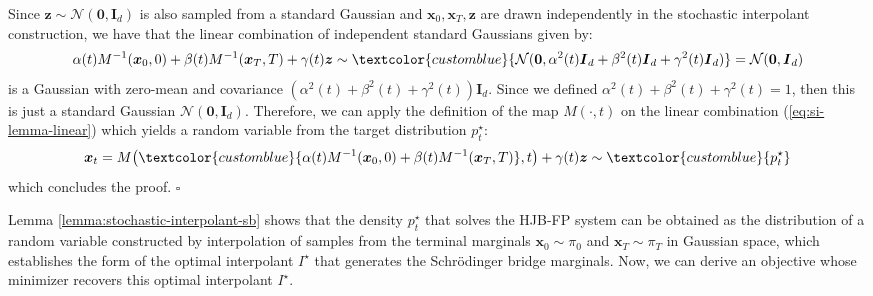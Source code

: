 \documentclass{article}
\newcommand{\bluetext}[1]{\textcolor{customblue}{#1}}
\begin{document}
Since $\boldsymbol{z}\sim \mathcal{N}(\boldsymbol{0}, \boldsymbol{I}_d)$ is also sampled from a standard Gaussian and $\boldsymbol{x}_0, \boldsymbol{x}_T, \boldsymbol{z}$ are drawn independently in the stochastic interpolant construction, we have that the linear combination of independent standard Gaussians given by:
\begin{align}
    \alpha(t)M^{-1}(\boldsymbol{x}_0, 0)+\beta(t)M^{-1}(\boldsymbol{x}_T,T)+\gamma(t)\boldsymbol{z}\sim \bluetext{\mathcal{N}(\boldsymbol{0}, \alpha^2(t)\boldsymbol{I}_d+\beta^2(t)\boldsymbol{I}_d+\gamma^2(t)\boldsymbol{I}_d)}=\mathcal{N}(\boldsymbol{0},\boldsymbol{I}_d)\label{eq:si-lemma-linear}
\end{align}
is a Gaussian with zero-mean and covariance $(\alpha^2(t)+\beta^2(t)+\gamma^2(t))\boldsymbol{I}_d$. Since we defined $\alpha^2(t)+\beta^2(t)+\gamma^2(t)=1$, then this is just a standard Gaussian $\mathcal{N}(\boldsymbol{0},\boldsymbol{I}_d)$. Therefore, we can apply the definition of the map $M(\cdot, t)$ on the linear combination (\ref{eq:si-lemma-linear}) which yields a random variable from the target distribution $p_t^\star$:
\begin{align}
    \boldsymbol{x}_t=M\big(\bluetext{\alpha(t)M^{-1}(\boldsymbol{x}_0, 0 ) +\beta(t)M^{-1}(\boldsymbol{x}_T, T)},t\big)+\gamma(t)\boldsymbol{z}\sim \bluetext{p_t^\star}
\end{align}
which concludes the proof. \hfill $\square$ 

Lemma \ref{lemma:stochastic-interpolant-sb} shows that the density $p_t^\star$ that solves the HJB-FP system can be obtained as the distribution of a random variable constructed by interpolation of samples from the terminal marginals $\boldsymbol{x}_0\sim \pi_0$ and $\boldsymbol{x}_T\sim \pi_T$ in Gaussian space, which establishes the form of the optimal interpolant $I^\star$ that generates the Schrödinger bridge marginals. Now, we can derive an objective whose minimizer recovers this optimal interpolant $I^\star$. 
\end{document}
